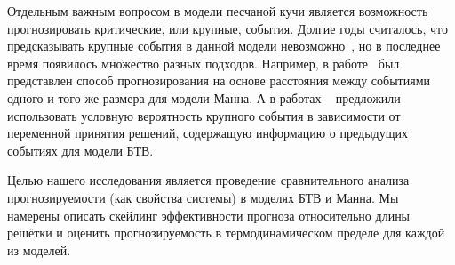 Отдельным важным вопросом в модели песчаной кучи является возможность прогнозировать критические, или крупные, события. Долгие годы считалось, что предсказывать крупные события в данной модели невозможно~\cite{Geller1997,Wyss1997,Milovanov2021}, но в последнее время появилось множество разных подходов. Например, в работе~\cite{deluca} был представлен способ прогнозирования на основе расстояния между событиями одного и того же размера для модели Манна. А в работах ~\cite{Hallerberg2009,Kantz2010} предложили использовать условную вероятность крупного события в зависимости от переменной принятия решений, содержащую информацию о предыдущих событиях для модели БТВ.

Целью нашего исследования является проведение сравнительного анализа прогнозируемости (как свойства системы) в моделях БТВ и Манна. Мы намерены описать скейлинг эффективности прогноза относительно длины решётки и оценить прогнозируемость в термодинамическом пределе для каждой из моделей.
